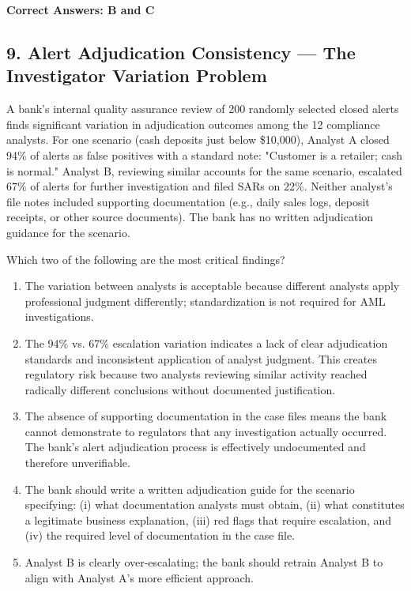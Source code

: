 \documentclass[11pt,a4paper]{article}
\begin{document}
	\textbf{Correct Answers: B and C}
	
	\subsection{9. Alert Adjudication Consistency — The Investigator Variation Problem}
	
	A bank's internal quality assurance review of 200 randomly selected closed alerts finds significant variation in adjudication outcomes among the 12 compliance analysts. For one scenario (cash deposits just below \$10,000), Analyst A closed 94\% of alerts as false positives with a standard note: "Customer is a retailer; cash is normal." Analyst B, reviewing similar accounts for the same scenario, escalated 67\% of alerts for further investigation and filed SARs on 22\%. Neither analyst's file notes included supporting documentation (e.g., daily sales logs, deposit receipts, or other source documents). The bank has no written adjudication guidance for the scenario.
	
	Which two of the following are the most critical findings?
	
	\begin{enumerate}[label=\Alph*.]
		\item The variation between analysts is acceptable because different analysts apply professional judgment differently; standardization is not required for AML investigations.
		\item The 94\% vs. 67\% escalation variation indicates a lack of clear adjudication standards and inconsistent application of analyst judgment. This creates regulatory risk because two analysts reviewing similar activity reached radically different conclusions without documented justification.
		\item The absence of supporting documentation in the case files means the bank cannot demonstrate to regulators that any investigation actually occurred. The bank's alert adjudication process is effectively undocumented and therefore unverifiable.
		\item The bank should write a written adjudication guide for the scenario specifying: (i) what documentation analysts must obtain, (ii) what constitutes a legitimate business explanation, (iii) red flags that require escalation, and (iv) the required level of documentation in the case file.
		\item Analyst B is clearly over-escalating; the bank should retrain Analyst B to align with Analyst A's more efficient approach.
	\end{enumerate}
	
\end{document}

